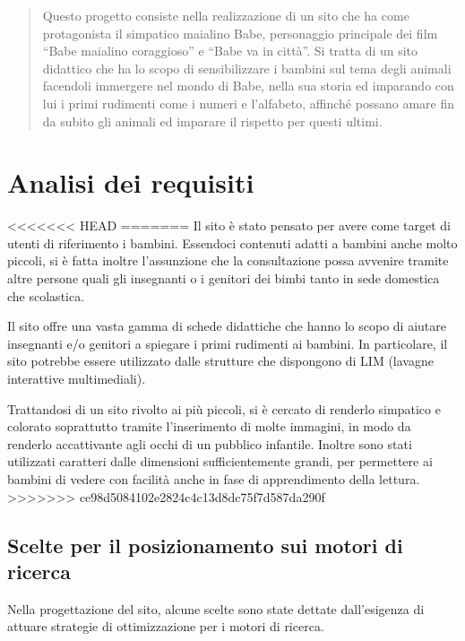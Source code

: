 \documentclass[10pt,a4paper,onecolumn]{article}
\begin{document}
\clearpage

\tableofcontents

\clearpage 

\begin{abstract}
Questo progetto consiste nella realizzazione di un sito che ha come protagonista il simpatico maialino Babe, personaggio principale dei film ``Babe maialino coraggioso'' e ``Babe va in città''.
Si tratta di un sito didattico che ha lo scopo di sensibilizzare i bambini sul tema degli animali facendoli immergere nel mondo di Babe, nella sua storia ed imparando con lui i primi rudimenti come i numeri e l'alfabeto, affinché possano amare fin da subito gli animali ed imparare il rispetto per questi ultimi.
\end{abstract}

\clearpage

\section{Analisi dei requisiti}
<<<<<<< HEAD
=======
Il sito è stato pensato per avere come target di utenti di riferimento i bambini. Essendoci contenuti adatti a bambini anche molto piccoli, si è fatta inoltre l'assunzione che la consultazione possa avvenire tramite altre persone quali gli insegnanti o i genitori dei bimbi tanto in sede domestica che scolastica. 

Il sito offre una vasta gamma di schede didattiche che hanno lo scopo di aiutare insegnanti e/o genitori a spiegare i primi rudimenti ai bambini.
In particolare, il sito potrebbe essere utilizzato dalle strutture che dispongono di LIM (lavagne interattive multimediali).

Trattandosi di un sito rivolto ai più piccoli, si è cercato di renderlo simpatico e colorato soprattutto tramite l'inserimento di molte immagini, in modo da renderlo accattivante agli occhi di un pubblico infantile. Inoltre sono stati utilizzati caratteri dalle dimensioni sufficientemente grandi, per permettere ai bambini di vedere con facilità anche in fase di apprendimento della lettura.
>>>>>>> ce98d5084102e2824c4c13d8dc75f7d587da290f

\subsection{Scelte per il posizionamento sui motori di ricerca}
Nella progettazione del sito, alcune scelte sono state dettate dall'esigenza di attuare strategie di ottimizzazione per i motori di ricerca.
\end{document}
